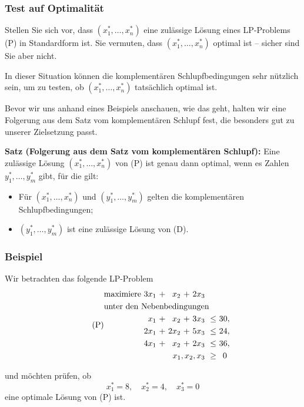 \documentclass[smaller]{beamer}
\begin{document}
\begin{frame}
 \frametitle{Test auf Optimalität}
 Stellen Sie sich vor, dass $(x_1^*,\ldots,x_n^*)$ eine zulässige Lösung eines LP-Problems (P) in Standardform ist. Sie vermuten, dass $(x_1^*,\ldots,x_n^*)$ optimal ist -- sicher sind Sie aber nicht. \\ \vspace*{0.2cm}

\alert{In dieser Situation können die komplementären Schlupfbedingungen sehr nützlich sein, um zu testen, ob $(x_1^*,\ldots,x_n^*)$ tatsächlich optimal ist}. \\\vspace*{0.2cm}

Bevor wir uns anhand eines Beispiels anschauen, wie das geht, halten wir eine Folgerung aus dem Satz vom komplementären Schlupf fest, die besonders gut zu unserer Zielsetzung passt. \\ \vspace*{0.2cm}

\textbf{Satz (Folgerung aus dem Satz vom komplementären Schlupf):}
Eine zulässige Lösung $(x_1^*,\ldots,x_n^*)$ von (P) ist genau dann optimal, wenn es Zahlen $y_1^*, \ldots, y_m^*$ gibt, für die gilt:
\begin{itemize}
\item Für $(x_1^*,\ldots,x_n^*)$ und $(y_1^*,\ldots,y_m^*)$ gelten die komplementären Schlupfbedingungen;
\item $(y_1^*,\ldots,y_m^*)$ ist eine zulässige Lösung von (D).
\end{itemize}
\end{frame}

\begin{frame}
 \frametitle{Beispiel}
Wir betrachten das folgende LP-Problem\label{page:7:1}
\begin{align}
\tag{P}
\begin{alignedat}{5}
& \text{maximiere } & 3x_1 &\ + &\ x_2 &\ + &\ 2x_3 & & \\
& \rlap{unter den Nebenbedingungen} & & & & & & & \\
&&  x_1 &\ + &\  x_2 &\ + &\ 3x_3 &\ \leq &\ 30, \\
&& 2x_1 &\ + &\ 2x_2 &\ + &\ 5x_3 &\ \leq &\ 24, \\
&& 4x_1 &\ + &\  x_2 &\ + &\ 2x_3 &\ \leq &\ 36, \\
&& & & & & \llap{$x_1, x_2, x_3$} &\ \geq &\ 0\
\end{alignedat}
\end{align}

und möchten prüfen, ob
\[
x_1^* = 8, \quad
x_2^* = 4, \quad
x_3^* = 0
\]
eine optimale Lösung von (P) ist.
\end{frame}
\end{document}
